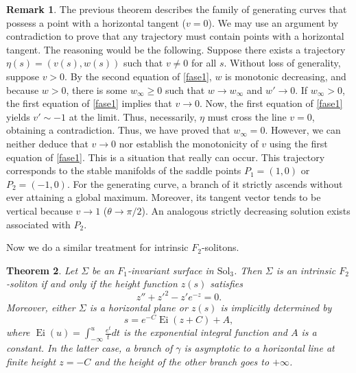 \documentclass[a4paper,12pt]{amsart}
\theoremstyle{plain}
\newtheorem{theorem}{Theorem}[section]
\theoremstyle{definition}
\newtheorem{remark}[theorem]{Remark}
\def\sol{\text{Sol}_3}
\begin{document}
 
 \begin{remark}
The previous theorem describes the family of generating curves that possess a point with a horizontal tangent ($v=0$). We may use an argument by contradiction to prove that any trajectory must contain points with a horizontal tangent. The reasoning would be the following. Suppose there exists a trajectory $\eta(s)=(v(s),w(s))$ such that $v\not=0$ for all $s$. Without loss of generality, suppose $v>0$. By the second equation of \eqref{fase1}, $w$ is monotonic decreasing, and because $w>0$, there is some $w_\infty\geq 0$ such that $w\to w_\infty$ and $w'\to 0$. If $w_\infty>0$, 
the first equation of \eqref{fase1} implies that $v\to 0$. Now, the first equation of \eqref{fase1} 
yields $v'\sim -1$ at the limit. Thus, necessarily, $\eta$ must cross the line $v=0$, obtaining a contradiction. Thus, we 
have proved that $w_\infty=0$. However, we can neither deduce that $v\to 0$ nor establish 
the monotonicity of $v$ using the first equation of \eqref{fase1}. This is a situation that 
really can occur. This trajectory corresponds to the stable manifolds of the saddle points 
$P_1=(1,0)$ or $P_2=(-1,0)$. For the generating curve, a branch of it strictly ascends 
without ever attaining a global maximum. Moreover, its tangent vector tends to be vertical 
because $v \to 1$ ($\theta \to \pi/2$). An analogous strictly decreasing solution exists associated with $P_2$.
\end{remark}


 
 Now we do a similar treatment for intrinsic $F_2$-solitons.
 
\begin{theorem}\label{t57}
Let $\Sigma$ be an $F_1$-invariant surface in $\sol$. Then $\Sigma$ is an intrinsic $F_2$-soliton if and only if the height function $z(s)$ satisfies
\begin{equation} \label{eq27}
z'' + z'^2 - z' e^{-z} = 0.
\end{equation}
Moreover, either $\Sigma$ is a horizontal plane or $z(s)$ is implicitly determined by
\begin{equation}\label{eq24}
s = e^{-C} \operatorname{Ei}(z + C) + A,
\end{equation}
where $\operatorname{Ei}(u) = \int_{-\infty}^u \frac{e^t}{t} dt$ is the exponential integral function and $A$ is a constant. In the latter case, a branch of $\gamma$ is asymptotic to a horizontal line at finite height $z = -C$ and the height of the other branch goes to $+\infty$.
\end{theorem}
 
\end{document}
